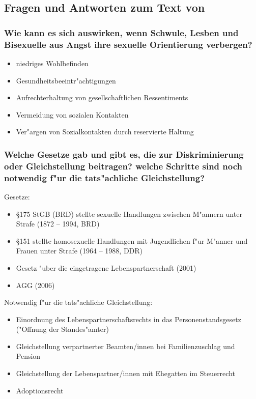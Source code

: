 \subsection{Fragen und Antworten zum Text von \textcite{steffens_diskriminierung_2009}}
\subsubsection{Wie kann es sich auswirken, wenn Schwule, Lesben und Bisexuelle aus Angst ihre sexuelle Orientierung verbergen?}
\begin{itemize}
        \item niedriges Wohlbefinden
        \item Gesundheitsbeeintr"achtigungen
        \item Aufrechterhaltung von gesellschaftlichen Ressentiments
        \item Vermeidung von sozialen Kontakten
        \item Ver"argen von Sozialkontakten durch reservierte Haltung
\end{itemize}

\subsubsection{Welche Gesetze gab und gibt es, die zur Diskriminierung oder Gleichstellung beitragen? welche Schritte sind noch notwendig f"ur die tats"achliche Gleichstellung?}
Gesetze:
\begin{itemize}
        \item \S 175 StGB (BRD) stellte sexuelle Handlungen zwischen M"annern unter Strafe (1872 -- 1994, BRD) 
        \item \S 151 stellte homosexuelle Handlungen mit Jugendlichen f"ur M"anner und Frauen unter Strafe (1964 -- 1988, DDR)
        \item Gesetz "uber die eingetragene Lebenspartnerschaft (2001)
        \item AGG (2006)
\end{itemize}

\noindent Notwendig f"ur die tats"achliche Gleichstellung:
\begin{itemize}
        \item Einordnung des Lebenspartnerschaftsrechts in das Personenstandsgesetz ("Offnung der Standes"amter)
        \item Gleichstellung verpartnerter Beamten/innen bei Familienzuschlag und Pension
        \item Gleichstellung der Lebenspartner/innen mit Ehegatten im Steuerrecht
        \item Adoptionsrecht
\end{itemize}

